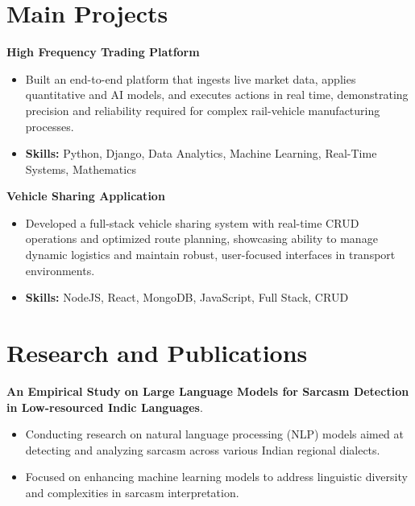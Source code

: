 \documentclass[a4paper,11pt]{article}
\begin{document}
\section{\textbf{Main Projects}}

\vspace{1mm}
  \textbf{High Frequency Trading Platform  }
\vspace{-1.5mm} %
\begin{itemize}
  \item Built an end-to-end platform that ingests live market data, applies quantitative and AI models, and executes actions in real time, demonstrating precision and reliability required for complex rail-vehicle manufacturing processes.
\vspace{-3mm}
  \item \textbf{Skills:} Python, Django, Data Analytics, Machine Learning, Real-Time Systems, Mathematics
\end{itemize}


\vspace{1mm}
   \textbf{Vehicle Sharing Application }
\vspace{-1.5mm} %
\begin{itemize}
  \item Developed a full-stack vehicle sharing system with real-time CRUD operations and optimized route planning, showcasing ability to manage dynamic logistics and maintain robust, user-focused interfaces in transport environments.
\vspace{-3mm}
  \item \textbf{Skills:} NodeJS, React, MongoDB, JavaScript, Full Stack, CRUD
\end{itemize}



\section{\textbf{Research and Publications} \hfill }
\vspace{1mm}
  \textbf{An Empirical Study on Large Language Models for Sarcasm Detection in Low-resourced Indic Languages}.
\vspace{-1mm} %
\begin{itemize}
  \item Conducting research on natural language processing (NLP) models aimed at detecting and analyzing sarcasm across various Indian regional dialects.
\vspace{-3mm}
  \item Focused on enhancing machine learning models to address linguistic diversity and complexities in sarcasm interpretation.
\end{itemize}
\end{document}
